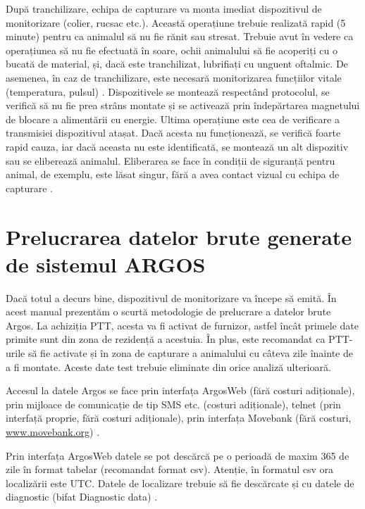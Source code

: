 \documentclass[11pt,onehalfspacing]{elife}
\begin{document}
După tranchilizare, echipa de capturare va monta imediat dispozitivul de monitorizare (colier, rucsac etc.). Această operațiune trebuie realizată rapid (5 minute) pentru ca animalul să nu fie rănit sau stresat. Trebuie avut în vedere ca operațiunea să nu fie efectuată în soare, ochii animalului să fie acoperiți cu o bucată de material, și, dacă este tranchilizat, lubrifiați cu unguent oftalmic. De asemenea, în caz de tranchilizare, este necesară monitorizarea funcțiilor vitale (temperatura, pulsul) \citep{Sikes2016}. Dispozitivele se montează respectând protocolul, se verifică să nu fie prea strâns montate și se activează prin îndepărtarea magnetului de blocare a alimentării cu energie. Ultima operațiune este cea de verificare a transmisiei dispozitivul atașat. Dacă acesta nu funcționează, se verifică foarte rapid cauza, iar dacă aceasta nu este identificată, se montează un alt dispozitiv sau se eliberează animalul. Eliberarea se face în condiții de siguranță pentru animal, de exemplu, este lăsat singur, fără a avea contact vizual cu echipa de capturare \citep{Silvy2012}.

\section{Prelucrarea datelor brute generate de sistemul ARGOS}
Dacă totul a decurs bine, dispozitivul de monitorizare va începe să emită. În acest manual prezentăm o scurtă metodologie de prelucrare a datelor brute Argos.
La achiziția PTT, acesta va fi activat de furnizor, astfel încât primele date primite sunt din zona de rezidență a acestuia. În plus, este recomandat ca PTT-urile să fie activate și în zona de capturare a animalului cu câteva zile înainte de a fi montate. Aceste date test trebuie eliminate din orice analiză ulterioară.

Accesul la datele Argos se face prin interfața ArgosWeb (fără costuri adiționale), prin mijloace de comunicație de tip SMS etc. (costuri adiționale), telnet (prin interfață proprie, fără costuri adiționale), prin interfața Movebank (fără costuri, \url{www.movebank.org}) \citep{Kranstauber2011}.

Prin interfața ArgosWeb datele se pot descărcă pe o perioadă de maxim 365 de zile în format tabelar (recomandat format csv). Atenție, în formatul csv ora localizării este UTC. Datele de localizare trebuie să fie descărcate și cu datele de diagnostic (bifat Diagnostic data) \citep{CLS2016}.
\end{document}
